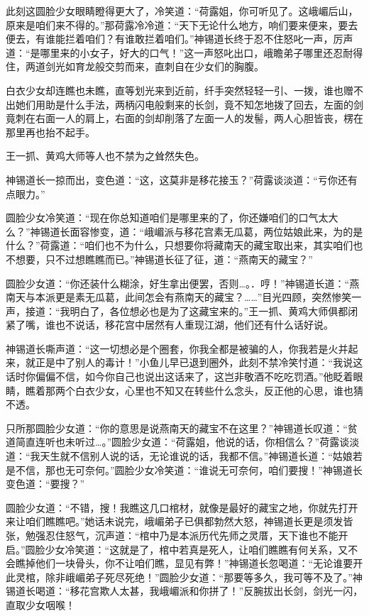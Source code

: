 \documentclass[12pt,oneside]{book}
\begin{document}
此刻这圆脸少女眼睛瞪得更大了，冷笑道：``荷露姐，你可听见了。这峨嵋后山，原来是咱们来不得的。''那荷露冷冷道：``天下无论什么地方，响们要来便来，要去便去，有谁能拦着咱们？有谁敢拦着咱们。''神锡道长终于忍不住怒叱一声，厉声道：``是哪里来的小女子，好大的口气！''这一声怒叱出口，峨瞻弟子哪里还忍耐得住，两道剑光如育龙般交剪而来，直刺自在少女们的胸腹。

白衣少女却连瞧也未瞧，直等划光来到近前，纤手突然轻轻一引、一拨，谁也赠不出她们用助是什么手法，两柄闪电般剩来的长剑，竟不知怎地拨了回去，左面的剑竟刺在右面一人的肩上，右面的剑却削落了左面一人的发髻，两人心胆皆丧，楞在那里再也抬不起手。

王一抓、黄鸡大师等人也不禁为之耸然失色。

神锡道长一掠而出，变色道：``这，这莫非是移花接玉？''荷露谈淡道：``亏你还有点眼力。''

圆脸少女冷笑道：``现在你总知道咱们是哪里来的了，你还嫌咱们的口气太大么？''神锡道长面容惨变，道：``峨嵋派与移花宫素无瓜葛，两位姑娘此来，为的是什么？''荷露道：``咱们也不为什么，只想要你将藏南天的藏宝取出来，其实咱们也不想要，只不过想瞧瞧而已。''神锡道长征了征，道：``燕南天的藏宝？''

圆脸少女道：``你还装什么糊涂，好生拿出便罢，否则\ldots。．哼！''神锡道长道：``燕南天与本派更是素无瓜葛，此间怎会有燕南天的藏宝？\ldots\ldots{}''目光四顾，突然惨笑一声，接道：``我明白了，各位想必也是为了这藏宝来的。''王一抓、黄鸡大师俱都闭紧了嘴，谁也不说话，移花宫中居然有人重现江湖，他们还有什么话好说。

神锡道长嘶声道：``这一切想必是个圈套，你我全都是被骗的人，你我若是火并起来，就正是中了别人的毒计！''小鱼儿早已退到圈外，此刻不禁冷笑忖道：``我说这话时你偏偏不信，如今你自己也说出这话来了，这岂非敬酒不吃吃罚酒。''他眨着眼睛，瞧着那两个白衣少女，心里也不知又在转些什么念头，反正他的心思，谁也猜不透。

只所那圆脸少女道：``你的意思是说燕南天的藏宝不在这里？''神锡道长叹道：``贫道简直连听也未听过\ldots。''圆脸少女道：``荷露姐，他说的话，你相信么？''荷露谈淡道：``我天生就不信别人说的话，无论谁说的话，我都不信。''神锡道长道：``姑娘若是不信，那也无可奈何。''圆脸少女冷笑道：``谁说无可奈何，咱们要搜！''神锡道长变色道：``要搜？''

圆脸少女道：``不错，搜！我瞧这几口棺材，就像是最好的藏宝之地，你就先打开来让咱们瞧瞧吧。''她话未说完，峨嵋弟子已俱都勃然大怒，神锡道长更是须发皆张，勉强忍住怒气，沉声道：``棺中乃是本派历代先师之灵厝，天下谁也不能开启。''圆脸少女冷笑道：``这就是了，棺中若真是死人，让咱们瞧瞧有何关系，又不会瞧掉他们一块骨头，你不让咱们瞧，显见有弊！''神锡道长忽喝道：``无论谁要开此灵棺，除非峨嵋弟子死尽死绝！''圆脸少女道：``那要等多久，我可等不及了。''神锡道长喝道：``移花宫欺人太甚，我峨嵋派和你拼了！''反腕拔出长剑，剑光一闪，直取少女咽喉！
\end{document}
